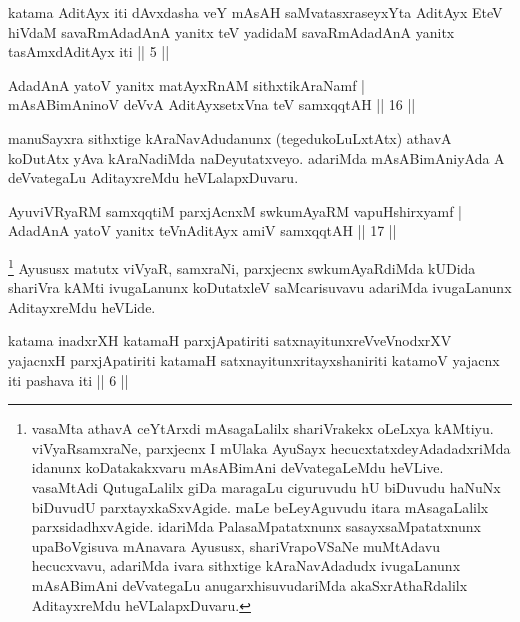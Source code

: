 
\begin{shl}
katama AditAyx iti dAvxdasha veY mAsAH saMvatasxraseyxYta AditAyx EteV hiVdaM savaRmAdadAnA yanitx teV yadidaM savaRmAdadAnA yanitx tasAmxdAditAyx iti || 5 ||
\end{shl}

\begin{shl}
AdadAnA yatoV yanitx matAyxRnAM sithxtikAraNamf |\\
mAsABimAninoV deVvA AditAyxsetxVna teV samxqqtAH \hfill || 16 ||
\end{shl}

\begin{artha}
manuSayxra sithxtige kAraNavAdudanunx (tegedukoLuLxtAtx) athavA koDutAtx yAva kAraNadiMda naDeyutatxveyo. adariMda mAsABimAniyAda A deVvategaLu AditayxreMdu heVLalapxDuvaru.
\end{artha}%


\begin{shl}
AyuviVRyaRM samxqqtiM parxjAcnxM swkumAyaRM vapuHshirxyamf |\\
AdadAnA yatoV yanitx teVnA\s \s ditAyx amiV samxqqtAH \hfill || 17 ||
\end{shl}

\begin{artha}
\footnote[1]{vasaMta athavA ceYtArxdi mAsagaLalilx shariVrakekx oLeLxya kAMtiyu. viVyaRsamxraNe, parxjecnx I mUlaka AyuSayx hecucxtatxdeyAdadadxriMda idanunx koDatakakxvaru mAsABimAni deVvategaLeMdu heVLive. vasaMtAdi QutugaLalilx giDa maragaLu ciguruvudu hU biDuvudu haNuNx biDuvudU parxtayxkaSxvAgide. maLe beLeyAguvudu itara mAsagaLalilx parxsidadhxvAgide. idariMda PalasaMpatatxnunx sasayxsaMpatatxnunx upaBoVgisuva mAnavara Ayususx, shariVrapoVSaNe muMtAdavu hecucxvavu, adariMda ivara sithxtige kAraNavAdadudx ivugaLanunx mAsABimAni deVvategaLu anugarxhisuvudariMda akaSxrAthaRdalilx AditayxreMdu heVLalapxDuvaru.} Ayususx matutx viVyaR, samxraNi, parxjecnx swkumAyaRdiMda kUDida shariVra kAMti ivugaLanunx koDutatxleV saMcarisuvavu adariMda ivugaLanunx AditayxreMdu heVLide.
\end{artha}

\begin{shl}
katama inadxrXH katamaH parxjApatiriti satxnayitunxreVveVnodxrXV yajacnxH parxjApatiriti katamaH satxnayitunxritayxshaniriti katamoV yajacnx iti pashava iti || 6 ||
\end{shl}

